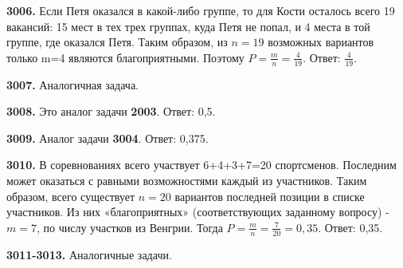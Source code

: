\textbf{3006.} Если Петя оказался в какой-либо группе, то для Кости осталось всего 19 вакансий: 15 мест в тех трех группах, куда Петя не попал, и 4 места в той группе, где оказался Петя. Таким образом, из $n=19$ возможных вариантов только m=4 являются благоприятными. Поэтому $P=\frac{m}{n}=\frac{4}{19}.$ \newline \null \hspace*{\fill} Ответ: $\frac{4}{19}.$ 

\textbf{3007.} Аналогичная задача.

\textbf{3008.} Это аналог задачи \textbf{2003}. \null \hspace*{\fill} Ответ: 0,5. 

\textbf{3009.} Аналог задачи \textbf{3004}.\newline \null \hspace*{\fill} Ответ: 0,375. 

\textbf{3010.} В соревнованиях всего участвует 6+4+3+7=20 спортсменов. Последним может оказаться с равными возможностями каждый из участников. Таким образом, всего существует $n=20$ вариантов последней позиции в списке участников. Из них «благоприятных» (соответствующих заданному вопросу) - $m=7$, по числу участков из Венгрии. Тогда $P = \frac{m}{n}=\frac{7}{20}=0,35.$\newline \null \hspace*{\fill} Ответ: 0,35. 

\textbf{3011-3013.} Аналогичные задачи.

